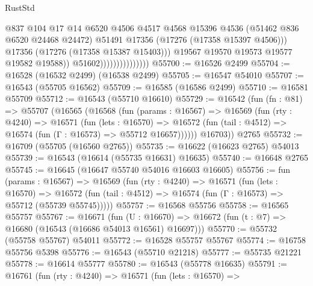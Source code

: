 \begin{lexlean}{RustStd}
\begin{coremodule}
                                          @837
                                          @104
                                          @17
                                          @14
                                          @6520
                                          @4506
                                          @4517
                                          @4568
                                          @15396
                                          @4536
                                          (@51462 @836 @6520 @24468 @24472)
                                          @51491
                                          @17356
                                          (@17276 (@17358 @15397 @4506)))
                                        @17356
                                        (@17276 (@17358 @15387 @15403)))
                                      @19567
                                      @19570
                                      @19573
                                      @19577
                                      @19582
                                      @19588))
                                  @51602)))))))))))))))
@55700 := @16526 @2499
@55704 := @16528 (@16532 @2499) (@16538 @2499)
@55705 := @16547 @54010
@55707 := @16543 (@55705 @16562)
@55709 := @16585 (@16586 @2499)
@55710 := @16581 @55709
@55712 := @16543 (@55710 @16610)
@55729 := @16542
    (fun (fn : @81) =>
    @55707
      (@16565
        (@16568
          (fun (params : @16567) =>
          @16569
            (fun (rty : @4240) =>
            @16571
              (fun (lets : @16570) =>
              @16572 (fun (tail : @4512) => @16574 (fun (Γ : @16573) => @55712 @16657))))))
        @16703))
    @2765
@55732 := @16709 (@55705 (@16560 @2765))
@55735 := @16622 (@16623 @2765) @54013
@55739 := @16543 (@16614 (@55735 @16631) @16635)
@55740 := @16648 @2765
@55745 := @16645 (@16647 @55740 @54016 @16603 @16605)
@55756 := fun (params : @16567) =>
  @16569
    (fun (rty : @4240) =>
    @16571
      (fun (lets : @16570) =>
      @16572 (fun (tail : @4512) => @16574 (fun (Γ : @16573) => @55712 (@55739 @55745)))))
@55757 := @16568 @55756
@55758 := @16565 @55757
@55767 := @16671
    (fun (U : @16670) => @16672 (fun (t : @7) => @16680 (@16543 (@16686 @54013 @16561) @16697)))
@55770 := @55732 (@55758 @55767) @54011
@55772 := @16528 @55757 @55767
@55774 := @16758 @55756 @5398
@55776 := @16543 (@55710 @21218)
@55777 := @55735 @21221
@55778 := @16614 @55777
@55780 := @16543 (@55778 @16635)
@55791 := @16761
    (fun (rty : @4240) =>
    @16571
      (fun (lets : @16570) =>

\end{coremodule}
\end{lexlean}
